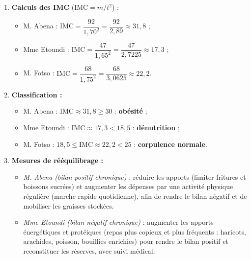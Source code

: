 \documentclass[11pt]{article}
\begin{document}
\begin{corrige}
\tcblower
\begin{enumerate}
\item \textbf{Calculs des IMC} ($\mathrm{IMC} = m/t^{2}$) :
\begin{itemize}
\item M. Abena : $\mathrm{IMC} = \dfrac{92}{1,70^{2}} = \dfrac{92}{2,89} \approx 31,8$ ;
\item Mme Etoundi : $\mathrm{IMC} = \dfrac{47}{1,65^{2}} = \dfrac{47}{2,7225} \approx 17,3$ ;
\item M. Fotso : $\mathrm{IMC} = \dfrac{68}{1,75^{2}} = \dfrac{68}{3,0625} \approx 22,2$.
\end{itemize}
\item \textbf{Classification :}
\begin{itemize}
\item M. Abena : $\mathrm{IMC} \approx 31,8 \geq 30$ : \textbf{obésité} ;
\item Mme Etoundi : $\mathrm{IMC} \approx 17,3 < 18,5$ : \textbf{dénutrition} ;
\item M. Fotso : $18,5 \leq \mathrm{IMC} \approx 22,2 < 25$ : \textbf{corpulence normale}.
\end{itemize}
\item \textbf{Mesures de rééquilibrage :}
\begin{itemize}
\item \emph{M. Abena (bilan positif chronique)} : réduire les apports (limiter fritures et boissons sucrées) et augmenter les dépenses par une activité physique régulière (marche rapide quotidienne), afin de rendre le bilan négatif et de mobiliser les graisses stockées.
\item \emph{Mme Etoundi (bilan négatif chronique)} : augmenter les apports énergétiques et protéiques (repas plus copieux et plus fréquents : haricots, arachides, poisson, bouillies enrichies) pour rendre le bilan positif et reconstituer les réserves, avec suivi médical.
\end{itemize}
\end{enumerate}
\end{corrige}
\end{document}
